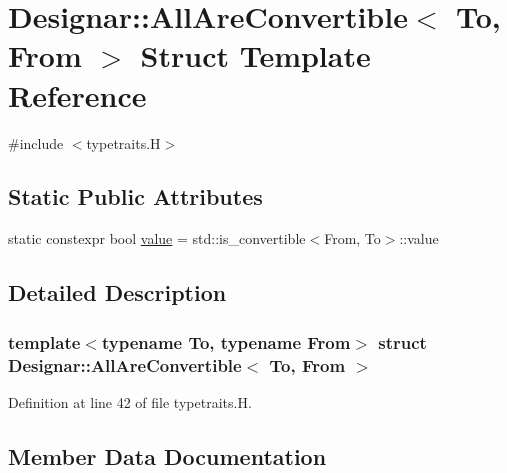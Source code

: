\hypertarget{struct_designar_1_1_all_are_convertible_3_01_to_00_01_from_01_4}{}\section{Designar\+:\+:All\+Are\+Convertible$<$ To, From $>$ Struct Template Reference}
\label{struct_designar_1_1_all_are_convertible_3_01_to_00_01_from_01_4}


{\ttfamily \#include $<$typetraits.\+H$>$}

\subsection*{Static Public Attributes}
\begin{DoxyCompactItemize}
\item 
static constexpr bool \hyperlink{struct_designar_1_1_all_are_convertible_3_01_to_00_01_from_01_4_a64662370d25f46762af5c4adc6a01a84}{value} = std\+::is\+\_\+convertible$<$From, To$>$\+::value
\end{DoxyCompactItemize}


\subsection{Detailed Description}
\subsubsection*{template$<$typename To, typename From$>$\newline
struct Designar\+::\+All\+Are\+Convertible$<$ To, From $>$}



Definition at line 42 of file typetraits.\+H.



\subsection{Member Data Documentation}
\mbox{\label{struct_designar_1_1_all_are_convertible_3_01_to_00_01_from_01_4_a64662370d25f46762af5c4adc6a01a84}} 

